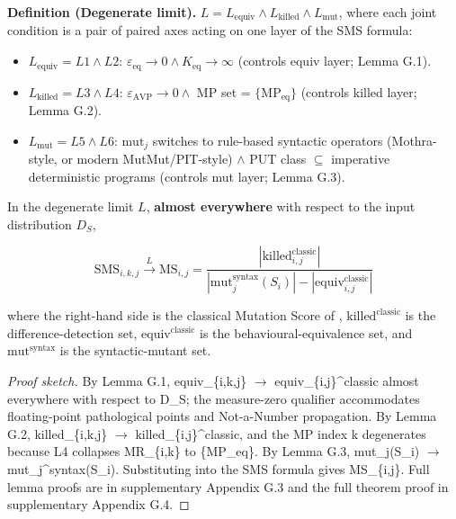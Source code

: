 \documentclass[manuscript,screen,review]{acmart}
\begin{document}
\textbf{Definition (Degenerate limit).}
$L = L_{\mathrm{equiv}} \wedge L_{\mathrm{killed}} \wedge L_{\mathrm{mut}}$, where each joint
condition is a pair of paired axes acting on one layer of the SMS
formula:

\begin{itemize}

\item
  $L_{\mathrm{equiv}} = L1 \wedge L2$: $\varepsilon_{\mathrm{eq}} \to 0 \wedge K_{\mathrm{eq}} \to \infty$ (controls equiv
  layer; Lemma G.1).
\item
  $L_{\mathrm{killed}} = L3 \wedge L4$: $\varepsilon_{\mathrm{AVP}} \to 0 \wedge$ MP set = $\{\mathrm{MP}_{\mathrm{eq}}\}$
  (controls killed layer; Lemma G.2).
\item
  $L_{\mathrm{mut}} = L5 \wedge L6$: $\mathrm{mut}_j$ switches to rule-based syntactic
  operators (Mothra-style, or modern MutMut/PIT-style) $\wedge$ PUT class $\subseteq$ imperative deterministic
  programs (controls mut layer; Lemma G.3).
\end{itemize}

\begin{theorem}\label{thm:degeneration}
In the degenerate limit
$L$, \textbf{almost everywhere} with respect to the input
distribution $D_S$,

\[ \mathrm{SMS}_{i,k,j} \xrightarrow{L} \mathrm{MS}_{i,j} = \frac{|\mathrm{killed}_{i,j}^{\mathrm{classic}}|}{|\mathrm{mut}_j^{\mathrm{syntax}}(S_i)| - |\mathrm{equiv}_{i,j}^{\mathrm{classic}}|} \]

where the right-hand side is the classical Mutation Score of
\citet{d7c38286734419b52de4262c9802ebdfcf4b9447},
$\mathrm{killed}^{\mathrm{classic}}$ is the difference-detection set,
$\mathrm{equiv}^{\mathrm{classic}}$ is the behavioural-equivalence set,
and $\mathrm{mut}^{\mathrm{syntax}}$ is the syntactic-mutant set.
\end{theorem}

\begin{proof}[Proof sketch]
By Lemma G.1, equiv\_\{i,k,j\} $\to$
equiv\_\{i,j\}\^{}classic almost everywhere with respect to D\_S; the
measure-zero qualifier accommodates floating-point pathological points
and Not-a-Number propagation. By Lemma G.2, killed\_\{i,k,j\} $\to$
killed\_\{i,j\}\^{}classic, and the MP index k degenerates because L4
collapses MR\_\{i,k\} to \{MP\_eq\}. By Lemma G.3, mut\_j(S\_i) $\to$
mut\_j\^{}syntax(S\_i). Substituting into the SMS formula gives
MS\_\{i,j\}. Full lemma proofs are in supplementary Appendix G.3 and the
full theorem proof in supplementary Appendix G.4.
\end{proof}
\end{document}
